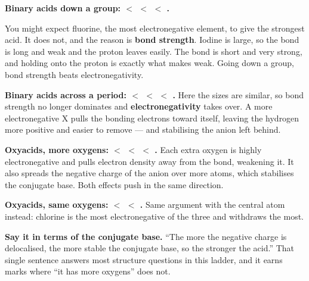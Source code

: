 \documentclass{apchem-worksheet}
\begin{document}
\begin{center}
\end{center}

\begin{workedexample}
\textbf{Binary acids down a group:  $<$  $<$ 
$<$ .}

You might expect fluorine, the most electronegative element, to give the
strongest acid. It does not, and the reason is \textbf{bond strength}.
Iodine is large, so the  bond is long and weak and the proton
leaves easily. The  bond is short and very strong, and holding
onto the proton is exactly what makes  weak. Going down a group,
bond strength beats electronegativity.

\textbf{Binary acids across a period:  $<$  $<$
 $<$ .} Here the sizes are similar, so bond strength no
longer dominates and \textbf{electronegativity} takes over. A more
electronegative X pulls the bonding electrons toward itself, leaving the
hydrogen more positive and easier to remove --- and stabilising the
anion left behind.

\textbf{Oxyacids, more oxygens:  $<$  $<$ 
$<$ .} Each extra oxygen is highly electronegative and pulls
electron density away from the  bond, weakening it. It also
spreads the negative charge of the anion over more atoms, which
stabilises the conjugate base. Both effects push in the same direction.

\textbf{Oxyacids, same oxygens:  $<$  $<$ .}
Same argument with the central atom instead: chlorine is the most
electronegative of the three and withdraws the most.

\textbf{Say it in terms of the conjugate base.} ``The more the negative
charge is delocalised, the more stable the conjugate base, so the
stronger the acid.'' That single sentence answers most structure
questions in this ladder, and it earns marks where ``it has more
oxygens'' does not.
\end{workedexample}
\end{document}
